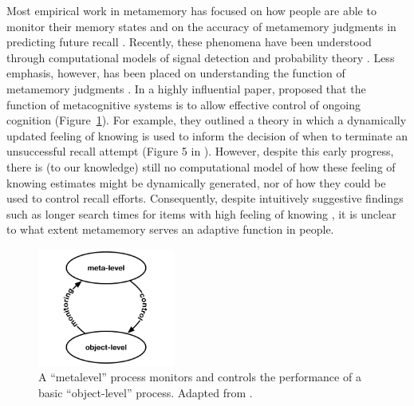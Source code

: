 Most empirical work in metamemory has focused on how people are able to monitor their memory states \citep{reder1992determines,miner1994new,eakin2005illusions} and on the accuracy of metamemory judgments in predicting future recall \citep{hart1965memory,vesonder1985ability,dunlosky1992importance,dunlosky2007metacomprehension}. Recently, these phenomena have been understood through computational models of signal detection \citep{jang2012stochastic} and probability theory \citep{hu2021bayesian}. Less emphasis, however, has been placed on understanding the function of metamemory judgments \citep{schwartz2017metamemory}. In a highly influential paper, \citetnelson{} proposed that the function of metacognitive systems is to allow effective control of ongoing cognition (Figure~\ref{fig:nelson}). For example, they outlined a theory in which a dynamically updated feeling of knowing is used to inform the decision of when to terminate an unsuccessful recall attempt (Figure 5 in \citealpnelson{}). However, despite this early progress, there is (to our knowledge) still no computational model of how these feeling of knowing estimates might be dynamically generated, nor of how they could be used to control recall efforts. Consequently, despite intuitively suggestive findings such as longer search times for items with high feeling of knowing \citep{nelson1984comparison,nhouyvanisvong1998rapid,gruneberg1977methodological,lachman1979metamemory}, it is unclear to what extent metamemory serves an adaptive function in people.

\begin{figure}
  \centering
  \includegraphics[width=0.4\textwidth]{figs/memory/nelson.pdf}
  \caption{ A ``metalevel'' process monitors and controls the performance of a basic ``object-level'' process. Adapted from \citetnelson{}.}
  \label{fig:nelson}
\end{figure}


